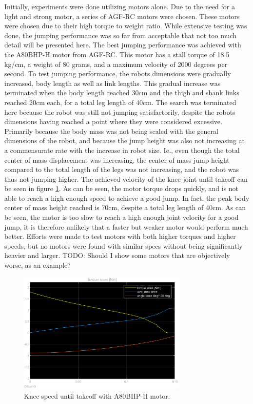 Initially, experiments were done utilizing motors alone. Due to the need for a light and strong motor, a series of AGF-RC motors were chosen. These motors were chosen due to their high torque to weight ratio. While extensive testing was done, the jumping performance was so far from acceptable that not too much detail will be presented here. The best jumping performance was achieved with the A80BHP-H motor from AGF-RC. This motor has a stall torque of 18.5 kg/cm, a weight of 80 grams, and a maximum velocity of 2000 degrees per second. To test jumping performance, the robots dimensions were gradually increased, body length as well as link lengths. This gradual increase was terminated when the body length reached 30cm and the thigh and shank links reached 20cm each, for a total leg length of 40cm. The search was terminated here because the robot was still not jumping satisfactorily, despite the robots dimensions having reached a point where they were considered excessive. Primarily because the body mass was not being scaled with the general dimensions of the robot, and because the jump height was also not increasing at a commensurate rate with the increase in robot size. Ie., even though the total center of mass displacement was increasing, the center of mass jump height compared to the total length of the legs was not increasing, and the robot was thus not jumping higher. The achieved velocity of the knee joint until takeoff can be seen in figure \ref{fig:joint_speed_A80BHM}. As can be seen, the motor torque drops quickly, and is not able to reach a high enough speed to achieve a good jump. In fact, the peak body center of mass height reached is 70cm, despite a total leg length of 40cm. As can be seen, the motor is too slow to reach a high enough joint velocity for a good jump, it is therefore unlikely that a faster but weaker motor would perform much better. Efforts were made to test motors with both higher torques and higher speeds, but no motors were found with similar specs without being significantly heavier and larger. TODO: Should I show some motors that are objectively worse, as an example? 

\begin{figure}[h]
    \centering
    \includegraphics[width=0.75\textwidth]{Images/joint_speed_A80BHM.eps}
    \caption{Knee speed until takeoff with A80BHP-H motor.}
    \label{fig:joint_speed_A80BHM}
\end{figure}

